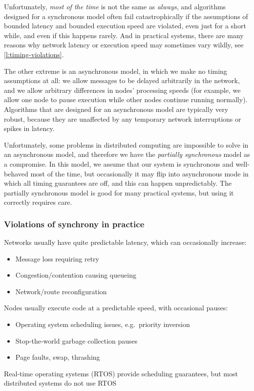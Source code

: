 Unfortunately, \emph{most of the time} is not the same as \emph{always}, and algorithms designed for a synchronous model often fail catastrophically if the assumptions of bounded latency and bounded execution speed are violated, even just for a short while, and even if this happens rarely.
And in practical systems, there are many reasons why network latency or execution speed may sometimes vary wildly, see \autoref{l:timing-violations}.

The other extreme is an asynchronous model, in which we make no timing assumptions at all: we allow messages to be delayed arbitrarily in the network, and we allow arbitrary differences in nodes' processing speeds (for example, we allow one node to pause execution while other nodes continue running normally).
Algorithms that are designed for an asynchronous model are typically very robust, because they are unaffected by any temporary network interruptions or spikes in latency.

Unfortunately, some problems in distributed computing are impossible to solve in an asynchronous model, and therefore we have the \emph{partially synchronous} model as a compromise.
In this model, we assume that our system is synchronous and well-behaved most of the time, but occasionally it may flip into asynchronous mode in which all timing guarantees are off, and this can happen unpredictably.
The partially synchronous model is good for many practical systems, but using it correctly requires care.

\begin{frame}
    \label{s:timing-violations}
    \frametitle{Violations of synchrony in practice}
    Networks usually have quite predictable latency, which can occasionally increase:
    \begin{itemize}
        \item Message loss requiring retry
        \item Congestion/contention causing queueing
        \item Network/route reconfiguration\\[1em]
    \end{itemize}\pause
    Nodes usually execute code at a predictable speed, with occasional pauses:
    \begin{itemize}
        \item Operating system scheduling issues, e.g.\ priority inversion
        \item Stop-the-world garbage collection pauses
        \item Page faults, swap, thrashing
    \end{itemize}
    Real-time operating systems (RTOS) provide scheduling guarantees, but most distributed systems do not use RTOS
\end{frame}
\label{l:timing-violations}

